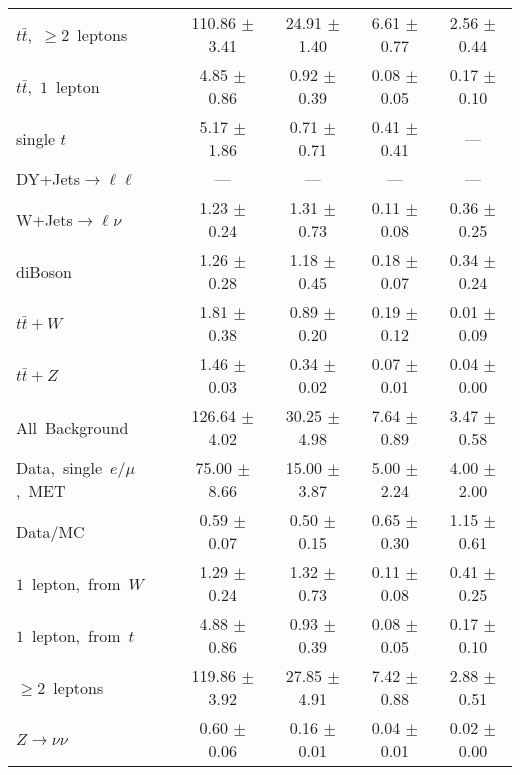 \documentclass{article}
\begin{document}
\begin{longtable}{|l|c|c|c|c|}
$t\bar{t}$,~$\ge2$~leptons & 110.86 $\pm$ 3.41  & 24.91 $\pm$ 1.40  & 6.61 $\pm$ 0.77  & 2.56 $\pm$ 0.44 \\* 
$t\bar{t}$,~$1$~lepton & 4.85 $\pm$ 0.86  & 0.92 $\pm$ 0.39  & 0.08 $\pm$ 0.05  & 0.17 $\pm$ 0.10 \\* 
single $t$  & 5.17 $\pm$ 1.86  & 0.71 $\pm$ 0.71  & 0.41 $\pm$ 0.41  & --- \\* 
DY+Jets$\rightarrow\ell\ell$  & ---  & ---  & ---  & --- \\* 
W+Jets$\rightarrow\ell\nu$  & 1.23 $\pm$ 0.24  & 1.31 $\pm$ 0.73  & 0.11 $\pm$ 0.08  & 0.36 $\pm$ 0.25 \\* 
diBoson  & 1.26 $\pm$ 0.28  & 1.18 $\pm$ 0.45  & 0.18 $\pm$ 0.07  & 0.34 $\pm$ 0.24 \\* 
$t\bar{t}+W$  & 1.81 $\pm$ 0.38  & 0.89 $\pm$ 0.20  & 0.19 $\pm$ 0.12  & 0.01 $\pm$ 0.09 \\* 
$t\bar{t}+Z$  & 1.46 $\pm$ 0.03  & 0.34 $\pm$ 0.02  & 0.07 $\pm$ 0.01  & 0.04 $\pm$ 0.00 \\* 
\hline \hline 
All~Background  & 126.64 $\pm$ 4.02  & 30.25 $\pm$ 4.98  & 7.64 $\pm$ 0.89  & 3.47 $\pm$ 0.58 \\* 
Data,~single~$e/\mu$,~MET  & 75.00 $\pm$ 8.66  & 15.00 $\pm$ 3.87  & 5.00 $\pm$ 2.24  & 4.00 $\pm$ 2.00 \\* 
Data/MC  & 0.59 $\pm$ 0.07  & 0.50 $\pm$ 0.15  & 0.65 $\pm$ 0.30  & 1.15 $\pm$ 0.61 \\* 
\hline \hline 
$1$~lepton,~from~$W$  & 1.29 $\pm$ 0.24  & 1.32 $\pm$ 0.73  & 0.11 $\pm$ 0.08  & 0.41 $\pm$ 0.25 \\* 
$1$~lepton,~from~$t$  & 4.88 $\pm$ 0.86  & 0.93 $\pm$ 0.39  & 0.08 $\pm$ 0.05  & 0.17 $\pm$ 0.10 \\* 
$\ge2$~leptons  & 119.86 $\pm$ 3.92  & 27.85 $\pm$ 4.91  & 7.42 $\pm$ 0.88  & 2.88 $\pm$ 0.51 \\* 
$Z\rightarrow\nu\nu$  & 0.60 $\pm$ 0.06  & 0.16 $\pm$ 0.01  & 0.04 $\pm$ 0.01  & 0.02 $\pm$ 0.00 \\* 
\hline 
\end{longtable} 

 
 
 
 
\pagebreak 

 
 
 
 
\end{document}
